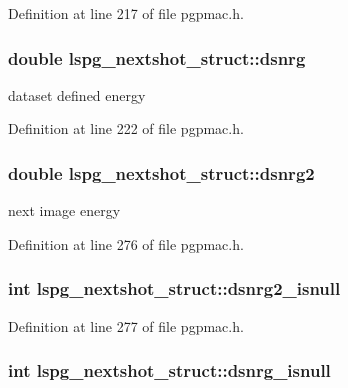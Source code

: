 Definition at line 217 of file pgpmac.\-h.

\hypertarget{structlspg__nextshot__struct_a371e574055fec7660b8f2e637eaf9f25}{
\subsubsection[{dsnrg}]{\setlength{\rightskip}{0pt plus 5cm}double lspg\-\_\-nextshot\-\_\-struct\-::dsnrg}}\label{structlspg__nextshot__struct_a371e574055fec7660b8f2e637eaf9f25}


dataset defined energy 



Definition at line 222 of file pgpmac.\-h.

\hypertarget{structlspg__nextshot__struct_ae461439c2af31255227765c0fb61850f}{
\subsubsection[{dsnrg2}]{\setlength{\rightskip}{0pt plus 5cm}double lspg\-\_\-nextshot\-\_\-struct\-::dsnrg2}}\label{structlspg__nextshot__struct_ae461439c2af31255227765c0fb61850f}


next image energy 



Definition at line 276 of file pgpmac.\-h.

\hypertarget{structlspg__nextshot__struct_aee9f8196dd9bcea832a60f2f0ea3a999}{
\subsubsection[{dsnrg2\-\_\-isnull}]{\setlength{\rightskip}{0pt plus 5cm}int lspg\-\_\-nextshot\-\_\-struct\-::dsnrg2\-\_\-isnull}}\label{structlspg__nextshot__struct_aee9f8196dd9bcea832a60f2f0ea3a999}


Definition at line 277 of file pgpmac.\-h.

\hypertarget{structlspg__nextshot__struct_ad14d8bb50290ec12e58f4aaec5cc5aab}{
\subsubsection[{dsnrg\-\_\-isnull}]{\setlength{\rightskip}{0pt plus 5cm}int lspg\-\_\-nextshot\-\_\-struct\-::dsnrg\-\_\-isnull}}\label{structlspg__nextshot__struct_ad14d8bb50290ec12e58f4aaec5cc5aab}


